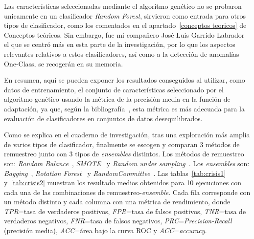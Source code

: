Las características seleccionadas mediante el algoritmo genético no se probaron unicamente en un clasificador \textit{Random Forest}, sirvieron como entrada para otros tipos de clasificador, como los comentados en el apartado~\ref{conceptos teoricos} de Conceptos teóricos. Sin embargo, fue mi compañero José Luis Garrido Labrador el que se centró más en esta parte de la investigación, por lo que los aspectos relevantes relativos a estos clasificadores, así como a la detección de anomalías One-Class, se recogerán en su memoria. 

En resumen, aquí se pueden exponer los resultados conseguidos al utilizar, como datos de entrenamiento, el conjunto de características seleccionado por el algoritmo genético usando la métrica de la precisión media en la función de adaptación, ya que, según la bibliografía~\cite{Davis2006RPR, saito2015pr}, esta métrica es más adecuada para la evaluación de clasificadores en conjuntos de datos desequilibrados. 

Como se explica en el cuaderno de investigación, tras una exploración más amplia de varios tipos de clasificador, finalmente se escogen y comparan 3 métodos de remuestreo junto con 3 tipos de \textit{ensembles} distintos. Los métodos de remuestreo son: \textit{Random Balance}~\cite{diez2015random}, \textit{SMOTE}~\cite{galar2012review} y \textit{Random under sampling}~\cite{diez2015diversity}. Los \textit{ensembles} son: \textit{Bagging}~\cite{galar2012review}, \textit{Rotation Forest}~\cite{rodriguez2006rotation} y \textit{RandomCommittee}~\cite{diez2015diversity}. Las tablas~\ref{tab:crisis1} y~\ref{tab:crisis2} muestran los resultado medios obtenidos para 10 ejecuciones con cada una de las combinaciones de remuestreo-\textit{ensemble}. Cada fila corresponde con un método distinto y cada columna con una métrica de rendimiento, donde \textit{TPR}=tasa de verdaderos positivos, \textit{FPR}=tasa de falsos positivos, \textit{TNR}=tasa de verdaderos negativos, \textit{FNR}=tasa de falsos negativos, \textit{PRC}=\textit{Precision-Recall} (precisión media), \textit{ACC}=área bajo la curva ROC y \textit{ACC}=\textit{accuracy}. 

